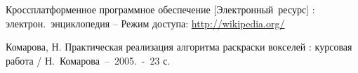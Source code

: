 \begin{thebibliography}{99}
		Кроссплатформенное программное обеспечение [Электронный~ресурс] : электрон.~энциклопедия -- Режим доступа:
		\url{http://wikipedia.org/}

		Комарова, Н. Практическая реализация алгоритма раскраски вокселей : курсовая работа / 
		Н.~Комарова~--~2005.~-~23 с.
	


\end{thebibliography}

